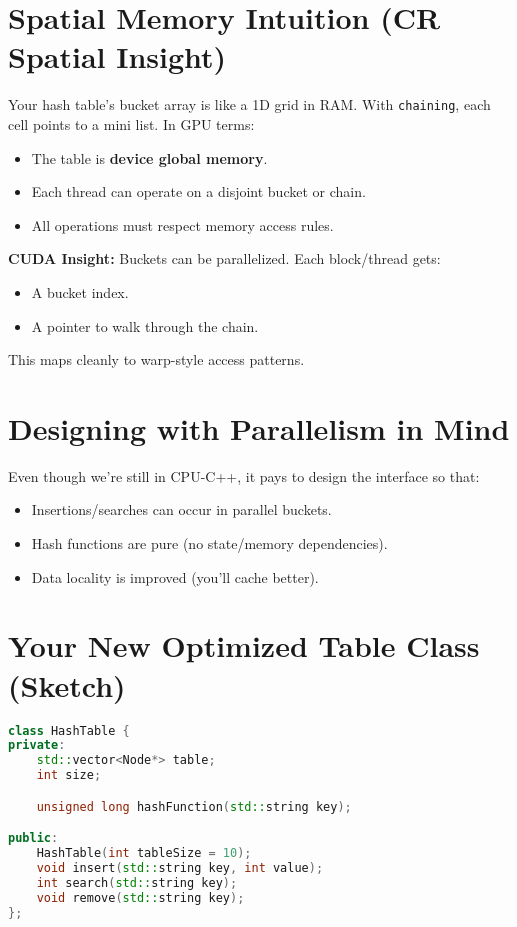 \documentclass{article}
\begin{document}
\section*{Spatial Memory Intuition (CR Spatial Insight)}

Your hash table’s bucket array is like a 1D grid in RAM. With \texttt{chaining}, each cell points to a mini list. In GPU terms:

\begin{itemize}
    \item The table is \textbf{device global memory}.
    \item Each thread can operate on a disjoint bucket or chain.
    \item All operations must respect memory access rules.
\end{itemize}

\textbf{CUDA Insight:} Buckets can be parallelized. Each block/thread gets:
\begin{itemize}
    \item A bucket index.
    \item A pointer to walk through the chain.
\end{itemize}

This maps cleanly to warp-style access patterns.

\section*{Designing with Parallelism in Mind}

Even though we’re still in CPU-C++, it pays to design the interface so that:

\begin{itemize}
    \item Insertions/searches can occur in parallel buckets.
    \item Hash functions are pure (no state/memory dependencies).
    \item Data locality is improved (you’ll cache better).
\end{itemize}

\section*{Your New Optimized Table Class (Sketch)}

\begin{lstlisting}[language=C++]
class HashTable {
private:
    std::vector<Node*> table;
    int size;

    unsigned long hashFunction(std::string key);

public:
    HashTable(int tableSize = 10);
    void insert(std::string key, int value);
    int search(std::string key);
    void remove(std::string key);
};
\end{lstlisting}
\end{document}
